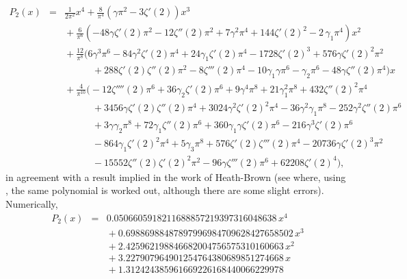 \documentclass[12pt,letterpaper]{amsart}
\theoremstyle{plain}
\theoremstyle{definition}
\theoremstyle{remark}
\numberwithin{equation}{subsection}
\numberwithin{theorem}{subsection}
\numberwithin{table}{subsection}
\begin{document}
\begin{eqnarray}
P_2(x) & =  &\frac{1}{2\pi^2} x^4 +
\frac{8}{\pi^4}
    \left(\gamma{\pi }^{2}-3\zeta'(2)\right) x^3  \nonumber \\&   &\mbox{} +\frac{6}{\pi^6}
    \left(
    -48\gamma\zeta'(2){\pi }^{2}-12\zeta''(2){\pi }^{2}+7\gamma^{2}{\pi }^{4}+
    144\zeta'(2)^{2}-2\,\gamma_1{\pi }^{4}\right) x^2  \nonumber \\&   &\mbox{} +\frac{12}{\pi^8}
    \biggl(
    6\gamma^{3}\pi^{6}-84\gamma^{2}\zeta'(2)\pi^{4}+24\gamma_1\zeta'(2)
    \pi^{4}-1728\zeta'(2)^{3}+
    576\gamma\zeta'(2)^{2}\pi^{2} \nonumber \\&   &\phantom{TTTTT}+288\zeta'(2)\zeta''(2)\pi^{2}-
    8\zeta'''(2)\pi^{4}-10\gamma_1\gamma\pi^{6}-
    \gamma_2\pi^{6}-48\gamma\zeta''(2)\pi^{4}
    \biggr)
    x  \nonumber \\&   &\mbox{} +\frac{4}{\pi^{10}}
    \biggl(
    -12\zeta''''(2){\pi }^{6}+36\gamma_2\zeta'(2){\pi }^{6}+9{\gamma}^{4}{\pi }^{8}+
    21\gamma_1^{2}{\pi }^{8}+432\zeta''(2)^{2}{\pi }^{4} \nonumber \\&   &\phantom{TTTTT}+3456
    \gamma\zeta'(2)\zeta''(2){\pi }^{4}+3024{\gamma}^{2}\zeta'(2)^{2}{\pi }^{4}-
    36{\gamma}^{2}\gamma_1{\pi }^{8}-252{\gamma}^{2}\zeta''(2){\pi }^{6}\nonumber \\&   &\phantom{TTTTT}+3\gamma\gamma_2{\pi}^{8}+
    72\gamma_1\zeta''(2){\pi }^{6}+360\gamma_1\gamma\zeta'(2){\pi }^{6}-216{\gamma}^{
    3}\zeta'(2){\pi }^{6}\nonumber \\&   &\phantom{TTTTT}-864\gamma_1\zeta'(2)^{2}{\pi }^{4}+5\gamma_3{\pi }^{8} +
    576\zeta'(2)\zeta'''(2){\pi }^{4}-20736\gamma\zeta'(2)^{3}{\pi }^{2} \nonumber \\&   &\phantom{TTTTT}-
    15552\zeta''(2)\zeta'(2)^{2}{\pi }^{2}-96\gamma\zeta'''(2){\pi }^{6}+62208
    \zeta'(2)^{4}
    \biggr),
\end{eqnarray}
in agreement with a result implied in the work of
Heath-Brown\cite{H-B1} (see \cite{C} where, using \cite{H-B1}, the
same polynomial is worked out, although there are some slight
errors). Numerically,
\begin{eqnarray}
 P_2(x) & =  &0.0506605918211688857219397316048638\,x^4 \nonumber \\&   &\mbox{} + 0.69886988487897996984709628427658502\,x^3  \nonumber \\&   &\mbox{} + 2.425962198846682004756575310160663\,x^2 \nonumber \\&   &\mbox{} + 3.227907964901254764380689851274668\,x\, \nonumber \\&   &\mbox{} + 1.312424385961669226168440066229978
\end{eqnarray}
\end{document}
